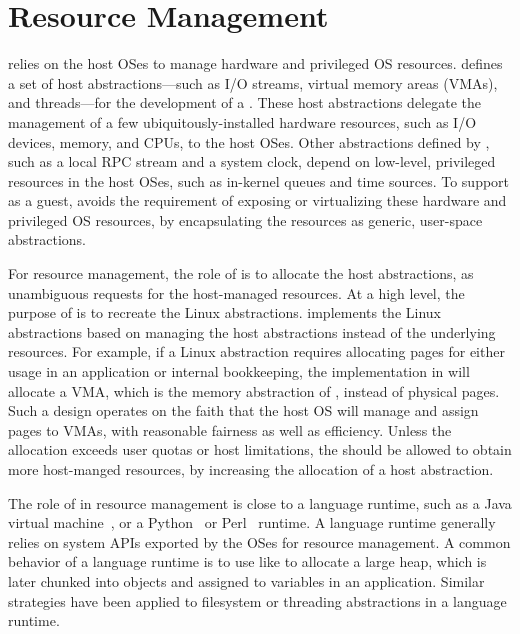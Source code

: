 \section{Resource Management}
\label{sec:libos:resource}


\Thelibos{}
relies on the host OSes to manage hardware and privileged OS resources.
\Thehostabi{}
defines a set of host abstractions---such as I/O streams, virtual memory areas (VMAs), and threads---for the development of a \libos{}.
These host abstractions delegate
the management of a few ubiquitously-installed hardware resources, such as I/O devices, memory, and CPUs,
to the host OSes.
Other abstractions defined
by \thehostabi{},
such as a local RPC stream and a system clock,
depend on low-level, privileged resources in the host OSes,
such as in-kernel queues and time sources.
To support \thelibos{} as a guest,
\thehostabi{} avoids the requirement of exposing or virtualizing %
these hardware and privileged OS resources,
by encapsulating the resources as generic, user-space abstractions.



For resource management, the role of \thelibos{}
is to allocate the host abstractions,
as unambiguous requests %
for the host-managed resources.
At a high level, the purpose of \thelibos{} is to recreate the Linux abstractions.
\Thelibos{} implements the Linux abstractions
based on managing the host abstractions instead of
the underlying resources.
For example, if a Linux abstraction requires allocating pages
for either usage in an application or
internal bookkeeping,
the implementation in
\thelibos{} will allocate a VMA, which is the memory abstraction of \thehostabi{}, instead of physical pages.
Such a \libos{} design operates on the faith that the host OS will manage and assign pages to VMAs, with reasonable fairness as well as efficiency.
Unless the allocation exceeds user quotas or host limitations,
the \libos{} should be allowed to obtain more host-manged resources,
by increasing the allocation of a host abstraction.



The role of \thelibos{} in resource management is close to a language runtime, such as a Java virtual machine~\cite{hotspot,j9,alpern2000jalapeno}, or a Python~\cite{python} or Perl~\cite{perl} runtime.
A language runtime generally relies on system APIs exported by the OSes
for resource management.
A common behavior of a language runtime
is to use \linuxapis{} like  to allocate a large heap,
which is later chunked into objects
and assigned to variables in an application.
Similar strategies have been applied to
filesystem or threading abstractions in a language runtime. %




